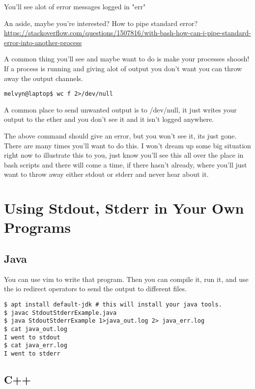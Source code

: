 \documentclass[12pt,a4paper]{article}
\begin{document}
You'll see alot of error messages logged in "err"

An aside, maybe you're interested? How to pipe standard error?
\url{https://stackoverflow.com/questions/1507816/with-bash-how-can-i-pipe-standard-error-into-another-process}

A common thing you'll see and maybe want to do is make your processes shoosh! If a process is running and giving alot of output you don't want you can throw away the output channels.

\begin{lstlisting}[style=term]
melvyn@laptop$ wc f 2>/dev/null 
\end{lstlisting}

A common place to send unwanted output is to /dev/null, it just writes your output to the ether and you don't see it and it isn't logged anywhere.

The above command should give an error, but you won't see it, its just gone. There are many times you'll want to do this. I won't dream up some big situation right now to illustrate this to you, just know you'll see this all over the place in bash scripts and there will come a time, if there hasn't already, where you'll just want to throw away either stdout or stderr and never hear about it.


\section*{Using Stdout, Stderr in Your Own Programs}

\subsection*{Java}



You can use vim to write that program. Then you can compile it, run it, and use
the io redirect operators to send the output to different files.

\begin{lstlisting}[style=term]
$ apt install default-jdk # this will install your java tools.
$ javac StdoutStderrExample.java
$ java StdoutStderrExample 1>java_out.log 2> java_err.log
$ cat java_out.log
I went to stdout
$ cat java_err.log
I went to stderr
\end{lstlisting}

\subsection*{C++}
\end{document}
